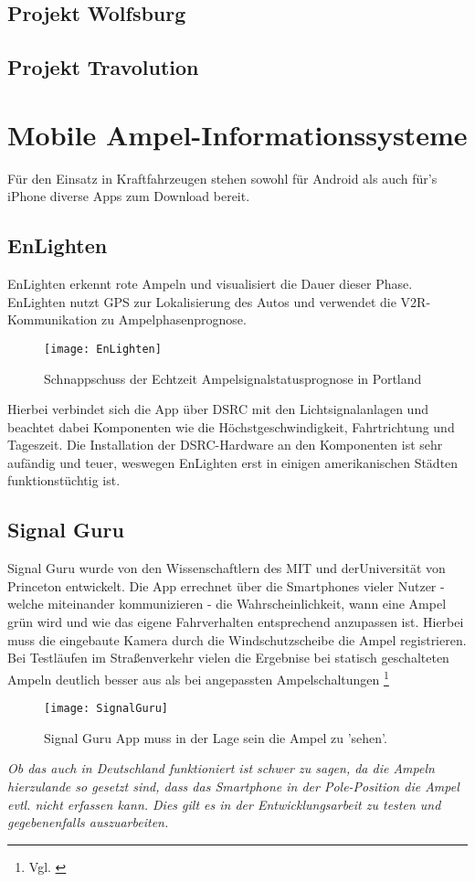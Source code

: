 \subsection{Projekt Wolfsburg}
\subsection{Projekt Travolution}
\section{Mobile Ampel-Informationssysteme}
Für den Einsatz in Kraftfahrzeugen stehen sowohl für Android als auch für's iPhone diverse Apps zum Download bereit. 
\subsection{EnLighten}
EnLighten erkennt rote Ampeln und visualisiert die Dauer dieser Phase.  
EnLighten nutzt \gls{GPS} zur Lokalisierung des Autos und verwendet die \gls{V2R}-Kommunikation zu Ampelphasenprognose.
\begin{figure}[h]
    \centering
    \texttt{[image: EnLighten]}
    \label{fig:Ampelsignalstatus}
    \caption[Echtzeit Ampelsignalstatus]{Schnappschuss der Echtzeit Ampelsignalstatusprognose in Portland}
\end{figure}
Hierbei verbindet sich die App über \gls{DSRC} mit den Lichtsignalanlagen und beachtet dabei Komponenten wie die Höchstgeschwindigkeit, Fahrtrichtung und Tageszeit.
Die Installation der \gls{DSRC}-Hardware an den Komponenten ist sehr aufändig und teuer, weswegen EnLighten erst in einigen amerikanischen Städten funktionstüchtig ist.
\subsection{Signal Guru}
Signal Guru wurde von den Wissenschaftlern des \gls{MIT} und derUniversität von Princeton entwickelt. Die App errechnet über die Smartphones vieler Nutzer - welche miteinander kommunizieren -  die Wahrscheinlichkeit, wann eine Ampel grün wird und wie das eigene Fahrverhalten entsprechend anzupassen ist. Hierbei muss die eingebaute Kamera durch die Windschutzscheibe die Ampel registrieren. Bei Testläufen im Straßenverkehr vielen die Ergebnise bei statisch geschalteten Ampeln deutlich besser aus als bei angepassten Ampelschaltungen \footnote{Vgl. \cite{SignalGuru}} 
\begin{figure}[h]
    \centering
    \texttt{[image: SignalGuru]}
    \caption[Signal Guru]{Signal Guru App muss in der Lage sein die Ampel zu 'sehen'.  \cite{SignalGuruPaper}}
    \label{fig:AbbSignalGuru}
\end{figure}
\textit{Ob das auch in Deutschland funktioniert ist schwer zu sagen, da die Ampeln hierzulande so gesetzt sind, dass das Smartphone in der Pole-Position die Ampel evtl. nicht erfassen kann. Dies gilt es in der Entwicklungsarbeit zu testen und gegebenenfalls auszuarbeiten.}
